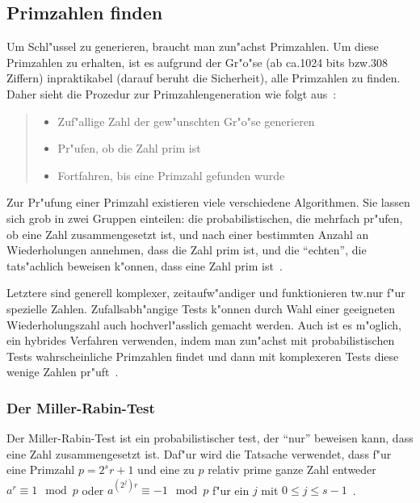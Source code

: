 \documentclass[12pt]{article}
\begin{document}
\subsection{Primzahlen finden}
Um Schl"ussel zu generieren, braucht man zun"achst Primzahlen.
Um diese Primzahlen zu erhalten, ist es aufgrund der Gr"o"se
(ab ca.\@ 1024 bits bzw.\@ 308 Ziffern)
inpraktikabel (darauf beruht die Sicherheit), alle Primzahlen zu finden.
Daher sieht die Prozedur zur Primzahlengeneration wie folgt aus~\cite{hac}:
\begin{quote}
\begin{itemize}
    \item Zuf"allige Zahl der gew"unschten Gr"o"se generieren
    \item Pr"ufen, ob die Zahl prim ist
    \item Fortfahren, bis eine Primzahl gefunden wurde
\end{itemize}
\end{quote}

Zur Pr"ufung einer Primzahl existieren viele verschiedene Algorithmen.
Sie lassen sich grob in zwei Gruppen einteilen:
die probabilistischen, die mehrfach pr"ufen, ob eine Zahl zusammengesetzt ist,
und nach einer bestimmten Anzahl an Wiederholungen annehmen, dass die Zahl prim ist,
und die "`echten"', die tats"achlich beweisen k"onnen, dass eine Zahl prim ist~\cite{hac}.

Letztere sind generell komplexer, zeitaufw"andiger und funktionieren tw.\@ nur
f"ur spezielle Zahlen.
Zufallsabh"angige Tests k"onnen durch Wahl einer geeigneten Wiederholungszahl
auch hochverl"asslich gemacht werden.
Auch ist es m"oglich, ein hybrides Verfahren verwenden,
indem man zun"achst mit probabilistischen Tests
wahrscheinliche Primzahlen findet und dann mit komplexeren Tests
diese wenige Zahlen pr"uft~\cite{hac}.

\subsubsection{Der Miller-Rabin-Test}
Der Miller-Rabin-Test ist ein probabilistischer test, der "`nur"' beweisen kann,
dass eine Zahl zusammengesetzt ist.
Daf"ur wird die Tatsache verwendet, dass f"ur eine Primzahl $p = 2^s r+1$ und eine
zu $p$ relativ prime ganze Zahl entweder $a^r \equiv 1 \mod p$ oder
$a^{(2^j)r} \equiv -1 \mod p$ f"ur ein $j$ mit $0 \leq j \leq s-1$~\cite{hac}.
\end{document}
